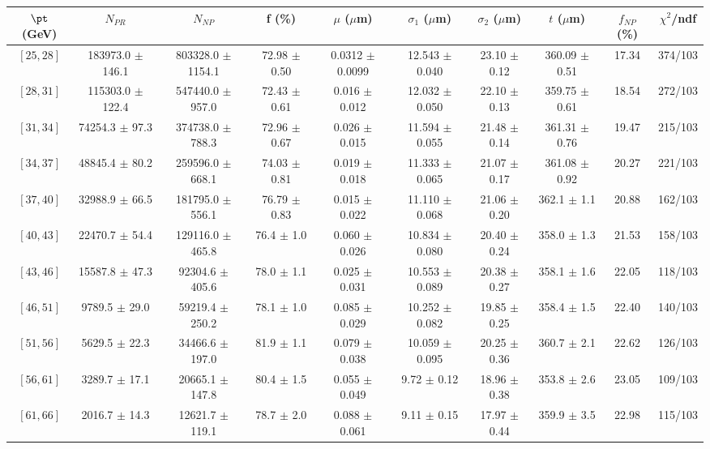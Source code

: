 \begin{tabular}{c||c|c|c|c|c|c|c||c|c}
$\pt$ (GeV) & $N_{PR}$ & $N_{NP}$ & f (\%) & $\mu$ ($\mu$m) & $\sigma_1$ ($\mu$m) & $\sigma_2$ ($\mu$m)  & $t$ ($\mu$m) & $f_{NP}$ (\%) & $\chi^2$/ndf \\
\hline
$[25, 28]$ & 183973.0 $\pm$ 146.1 & 803328.0 $\pm$ 1154.1 & 72.98 $\pm$ 0.50 & 0.0312 $\pm$ 0.0099 & 12.543 $\pm$ 0.040 & 23.10 $\pm$ 0.12 & 360.09 $\pm$ 0.51 & 17.34 & 374/103\\
$[28, 31]$ & 115303.0 $\pm$ 122.4 & 547440.0 $\pm$ 957.0 & 72.43 $\pm$ 0.61 & 0.016 $\pm$ 0.012 & 12.032 $\pm$ 0.050 & 22.10 $\pm$ 0.13 & 359.75 $\pm$ 0.61 & 18.54 & 272/103\\
$[31, 34]$ & 74254.3 $\pm$ 97.3 & 374738.0 $\pm$ 788.3 & 72.96 $\pm$ 0.67 & 0.026 $\pm$ 0.015 & 11.594 $\pm$ 0.055 & 21.48 $\pm$ 0.14 & 361.31 $\pm$ 0.76 & 19.47 & 215/103\\
$[34, 37]$ & 48845.4 $\pm$ 80.2 & 259596.0 $\pm$ 668.1 & 74.03 $\pm$ 0.81 & 0.019 $\pm$ 0.018 & 11.333 $\pm$ 0.065 & 21.07 $\pm$ 0.17 & 361.08 $\pm$ 0.92 & 20.27 & 221/103\\
$[37, 40]$ & 32988.9 $\pm$ 66.5 & 181795.0 $\pm$ 556.1 & 76.79 $\pm$ 0.83 & 0.015 $\pm$ 0.022 & 11.110 $\pm$ 0.068 & 21.06 $\pm$ 0.20 & 362.1 $\pm$ 1.1 & 20.88 & 162/103\\
$[40, 43]$ & 22470.7 $\pm$ 54.4 & 129116.0 $\pm$ 465.8 & 76.4 $\pm$ 1.0 & 0.060 $\pm$ 0.026 & 10.834 $\pm$ 0.080 & 20.40 $\pm$ 0.24 & 358.0 $\pm$ 1.3 & 21.53 & 158/103\\
$[43, 46]$ & 15587.8 $\pm$ 47.3 & 92304.6 $\pm$ 405.6 & 78.0 $\pm$ 1.1 & 0.025 $\pm$ 0.031 & 10.553 $\pm$ 0.089 & 20.38 $\pm$ 0.27 & 358.1 $\pm$ 1.6 & 22.05 & 118/103\\
$[46, 51]$ & 9789.5 $\pm$ 29.0 & 59219.4 $\pm$ 250.2 & 78.1 $\pm$ 1.0 & 0.085 $\pm$ 0.029 & 10.252 $\pm$ 0.082 & 19.85 $\pm$ 0.25 & 358.4 $\pm$ 1.5 & 22.40 & 140/103\\
$[51, 56]$ & 5629.5 $\pm$ 22.3 & 34466.6 $\pm$ 197.0 & 81.9 $\pm$ 1.1 & 0.079 $\pm$ 0.038 & 10.059 $\pm$ 0.095 & 20.25 $\pm$ 0.36 & 360.7 $\pm$ 2.1 & 22.62 & 126/103\\
$[56, 61]$ & 3289.7 $\pm$ 17.1 & 20665.1 $\pm$ 147.8 & 80.4 $\pm$ 1.5 & 0.055 $\pm$ 0.049 & 9.72 $\pm$ 0.12 & 18.96 $\pm$ 0.38 & 353.8 $\pm$ 2.6 & 23.05 & 109/103\\
$[61, 66]$ & 2016.7 $\pm$ 14.3 & 12621.7 $\pm$ 119.1 & 78.7 $\pm$ 2.0 & 0.088 $\pm$ 0.061 & 9.11 $\pm$ 0.15 & 17.97 $\pm$ 0.44 & 359.9 $\pm$ 3.5 & 22.98 & 115/103\\

\end{tabular}
